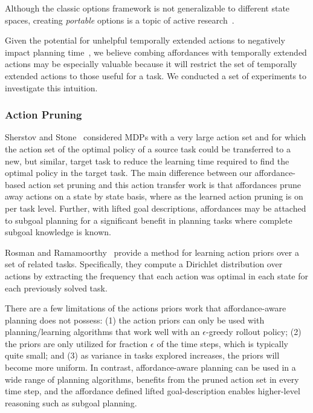 \documentclass[conference]{IEEEtran}
\begin{document}
Although the classic options framework is not generalizable to different state spaces,
creating {\em portable} options is a topic of active research~\cite{konidaris07,konidaris2009efficient,Ravindran03analgebraic,croonenborghs2008learning,andre2002state,konidaris2012transfer}.

Given the potential for unhelpful temporally extended actions to negatively impact planning time~\cite{Jong:2008zr}, we believe combing affordances with temporally extended actions
may be especially valuable because it will restrict the set of temporally extended actions to those
useful for a task. We conducted a set of experiments to investigate this intuition.

\subsubsection{Action Pruning}

Sherstov and Stone~\cite{sherstov2005improving} considered MDPs with a very large 
action set and for which the action set of the optimal policy of a source task could be 
transferred to a new, but similar, target task to reduce the learning time required to find
the optimal policy in the target task. The main difference between our affordance-based 
action set pruning and this action transfer work is that affordances prune away actions on 
a state by state basis, where as the learned action pruning is on per task level. Further, 
with lifted goal descriptions, affordances may be attached to subgoal planning for a significant
benefit in planning tasks where complete subgoal knowledge is known.

Rosman and Ramamoorthy~\cite{rosman2012good} provide a method for learning action
priors over a set of related tasks. Specifically, they compute a Dirichlet distribution over 
actions by extracting the frequency that each action was optimal in each state for each 
previously solved task.

There are a few limitations of the actions priors work that affordance-aware planning
does not possess: (1) the action priors can only be used with planning/learning algorithms
that work well with an $\epsilon$-greedy rollout policy; (2) the priors are only utilized for 
fraction $\epsilon$ of the time steps, which is typically quite small; and (3) as variance in
tasks explored increases, the priors will become more uniform. In contrast, affordance-aware
planning can be used in a wide range of planning algorithms, benefits from the pruned action
set in every time step, and the affordance defined lifted goal-description enables higher-level 
reasoning such as subgoal planning.
\end{document}
